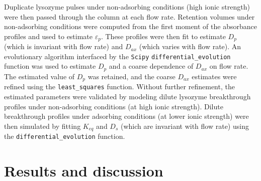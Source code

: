 \documentclass[preprint,review,12pt]{elsarticle}
\begin{document}
        Duplicate lysozyme pulses under non-adsorbing conditions (high ionic strength) were then passed through the column at each flow rate. Retention volumes under non-adsorbing conditions were computed from the first moment of the absorbance profiles and used to estimate $\varepsilon_p$. These profiles were then fit to estimate $D_p$ (which is invariant with flow rate) and $D_{ax}$ (which varies with flow rate). An evolutionary algorithm interfaced by the \texttt{Scipy} \texttt{differential\_evolution} function was used to estimate $D_p$ and a coarse dependence of $D_{ax}$ on flow rate. The estimated value of $D_p$ was retained, and the coarse $D_{ax}$ estimates were refined using the \texttt{least\_squares} function. Without further refinement, the estimated parameters were validated by modeling dilute lysozyme breakthrough profiles under non-adsorbing conditions (at high ionic strength). Dilute breakthrough profiles under adsorbing conditions (at lower ionic strength) were then simulated by fitting $K_{eq}$ and $D_s$ (which are invariant with flow rate) using the \texttt{differential\_evolution} function.


\section{Results and discussion} \label{sec:results}
\end{document}

